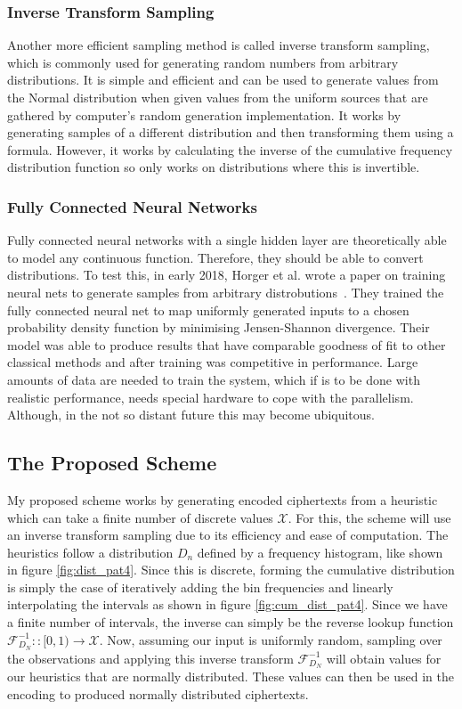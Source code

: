 \documentclass[ %
                    author={Samuel Russell},
                supervisor={Prof. Bogdan Warinschi},
                    degree={MEng},
                     title={Innocuous Ciphertexts},
                  subtitle={The DE-CENSOR Scheme},
                      type={Research},
                      year={2018} ]{dissertation}
\begin{document}
\subsubsection{Inverse Transform Sampling}

Another more efficient sampling method is called inverse transform sampling, which is commonly used for generating random numbers from arbitrary distributions.
It is simple and efficient and can be used to generate values from the Normal distribution when given values from the uniform sources that are gathered by computer's random generation implementation.
It works by generating samples of a different distribution and then transforming them using a formula.
However, it works by calculating the inverse of the cumulative frequency distribution function so only works on distributions where this is invertible.

\subsubsection{Fully Connected Neural Networks}

Fully connected neural networks with a single hidden layer are theoretically able to model any continuous function.
Therefore, they should be able to convert distributions.
To test this, in early 2018, Horger et al. wrote a paper on training neural nets to generate samples from arbitrary distrobutions~\cite{deepl}.
They trained the fully connected neural net to map uniformly generated inputs to a chosen probability density function by minimising Jensen-Shannon divergence.
Their model was able to produce results that have comparable goodness of fit to other classical methods and after training was competitive in performance.
Large amounts of data are needed to train the system, which if is to be done with realistic performance, needs special hardware to cope with the parallelism. Although, in the not so distant future this may become ubiquitous.

\subsection{The Proposed Scheme}

My proposed scheme works by generating encoded ciphertexts from a heuristic which can take a finite number of discrete values $\mathcal{X}$. For this, the scheme will use an inverse transform sampling due to its efficiency and ease of computation.
The heuristics follow a distribution $D_n$ defined by a frequency histogram, like shown in figure \ref{fig:dist_pat4}.
Since this is discrete, forming the cumulative distribution is simply the case of iteratively adding the bin frequencies and linearly interpolating the intervals as shown in figure \ref{fig:cum_dist_pat4}.
Since we have a finite number of intervals, the inverse can simply be the reverse lookup function $\mathcal{F}^{-1}_{D_N} :: [0,1) \rightarrow \mathcal{X}$.
Now, assuming our input is uniformly random, sampling over the observations and applying this inverse transform $\mathcal{F}^{-1}_{D_N}$ will obtain values for our heuristics that are normally distributed.
These values can then be used in the encoding to produced normally distributed ciphertexts.
\end{document}
